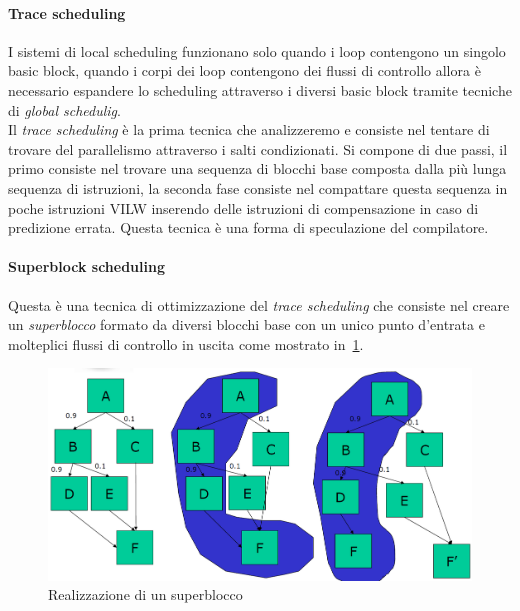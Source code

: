 \paragraph{Trace scheduling}
I sistemi di local scheduling funzionano solo quando i loop contengono un singolo basic block, quando i corpi dei loop contengono dei flussi di controllo allora è necessario espandere lo scheduling attraverso i diversi basic block tramite tecniche di \emph{global schedulig}.\\
Il \emph{trace scheduling} è la prima tecnica che analizzeremo e consiste nel tentare di trovare del parallelismo attraverso i salti condizionati. Si compone di due passi, il primo consiste nel trovare una sequenza di blocchi base composta dalla più lunga sequenza di istruzioni, la seconda fase consiste nel compattare questa sequenza in poche istruzioni VILW inserendo delle istruzioni di compensazione in caso di predizione errata. Questa tecnica è una forma di speculazione del compilatore.
\paragraph{Superblock scheduling}
Questa è una tecnica di ottimizzazione del \emph{trace scheduling} che consiste nel creare un \emph{superblocco} formato da diversi blocchi base con un unico punto d'entrata e molteplici flussi di controllo in uscita come mostrato in \figurename\,\ref{fig:superblock}.
\begin{figure}[htb]
\centering
\includegraphics[scale=0.5]{img/superblock.png}
\caption{Realizzazione di un superblocco}\label{fig:superblock}
\end{figure}
